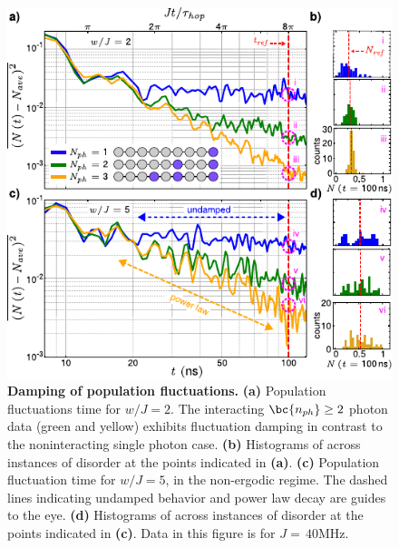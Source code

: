 \begin{figure}[tb]
        \centering
        \includegraphics[width=89 mm]{./PDF/f3_190714_509p.pdf}
        \caption{\small
        \textbf{Damping of population fluctuations.}
        \textbf{(a)}  Population fluctuations  time for $w/J=2$.%
        The interacting $\bc{n_{ph}} \geq 2$ photon data (green and yellow) exhibits fluctuation damping in contrast to the noninteracting single photon case.
        \textbf{(b)}  Histograms of  across instances of disorder at the points indicated in \textbf{(a)}.
        \textbf{(c)}  Population fluctuation  time for $w/J=5$, in the non-ergodic regime.  The dashed lines indicating undamped behavior and power law decay are guides to the eye.
        \textbf{(d)}  Histograms of  across instances of disorder at the points indicated in \textbf{(c)}.
        Data in this figure is for $J=\,40 \text{MHz}$.
        }
\end{figure}

